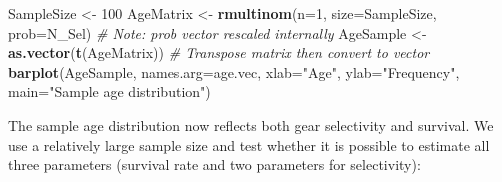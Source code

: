 \documentclass[
]{krantz}
\makeatletter
\newenvironment{Shaded}{\begin{snugshade}}{\end{snugshade}}
\newcommand{\AttributeTok}[1]{\textcolor[rgb]{0.27,0.27,0.27}{#1}}
\newcommand{\CommentTok}[1]{\textcolor[rgb]{0.37,0.37,0.37}{\textit{#1}}}
\newcommand{\DecValTok}[1]{\textcolor[rgb]{0.06,0.06,0.06}{#1}}
\newcommand{\FunctionTok}[1]{\textcolor[rgb]{0.27,0.27,0.27}{\textbf{#1}}}
\newcommand{\NormalTok}[1]{#1}
\newcommand{\OtherTok}[1]{\textcolor[rgb]{0.37,0.37,0.37}{#1}}
\newcommand{\StringTok}[1]{\textcolor[rgb]{0.5,0.5,0.5}{#1}}
\newenvironment{kframe}{%
\medskip{}
\setlength{\fboxsep}{.8em}
 \def\at@end@of@kframe{}%
 \ifinner\ifhmode%
  \def\at@end@of@kframe{\end{minipage}}%
  \begin{minipage}{\columnwidth}%
 \fi\fi%
 \def\FrameCommand##1{\hskip\@totalleftmargin \hskip-\fboxsep
 \colorbox{shadecolor}{##1}\hskip-\fboxsep
     \hskip-\linewidth \hskip-\@totalleftmargin \hskip\columnwidth}%
 \MakeFramed {\advance\hsize-\width
   \@totalleftmargin\z@ \linewidth\hsize
   \@setminipage}}%
 {\par\unskip\endMakeFramed%
 \at@end@of@kframe}
\renewenvironment{Shaded}{\begin{kframe}}{\end{kframe}}
\makeatother
\begin{document}
\begin{Shaded}
\begin{Highlighting}[]
\NormalTok{SampleSize }\OtherTok{\textless{}{-}} \DecValTok{100}
\NormalTok{AgeMatrix }\OtherTok{\textless{}{-}} \FunctionTok{rmultinom}\NormalTok{(}\AttributeTok{n=}\DecValTok{1}\NormalTok{, }\AttributeTok{size=}\NormalTok{SampleSize, }\AttributeTok{prob=}\NormalTok{N\_Sel)}
  \CommentTok{\# Note: prob vector rescaled internally}
\NormalTok{AgeSample }\OtherTok{\textless{}{-}} \FunctionTok{as.vector}\NormalTok{(}\FunctionTok{t}\NormalTok{(AgeMatrix)) }\CommentTok{\# Transpose matrix then convert to vector}
\FunctionTok{barplot}\NormalTok{(AgeSample, }\AttributeTok{names.arg=}\NormalTok{age.vec, }\AttributeTok{xlab=}\StringTok{"Age"}\NormalTok{, }
        \AttributeTok{ylab=}\StringTok{"Frequency"}\NormalTok{, }\AttributeTok{main=}\StringTok{"Sample age distribution"}\NormalTok{)}
\end{Highlighting}
\end{Shaded}

The sample age distribution now reflects both gear selectivity and survival. We use a relatively large sample size and test whether it is possible to estimate all three parameters (survival rate and two parameters for selectivity):
\end{document}
